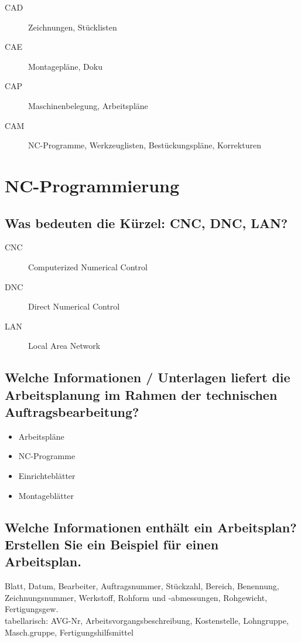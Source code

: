 \begin{description}
\item[CAD] Zeichnungen, Stücklisten
\item[CAE] Montagepläne, Doku
\item[CAP] Maschinenbelegung, Arbeitspläne
\item[CAM] NC-Programme, Werkzeuglisten, Bestückungspläne, Korrekturen
\end{description}

\newpage

\section{NC-Programmierung}

\subsection*{Was bedeuten die Kürzel: CNC, DNC, LAN?}

\begin{description}
\item[CNC] Computerized Numerical Control
\item[DNC] Direct Numerical Control
\item[LAN] Local Area Network
\end{description}

\subsection*{Welche Informationen / Unterlagen liefert die Arbeitsplanung im Rahmen der technischen Auftragsbearbeitung?}

\begin{itemize}
\item Arbeitspläne
\item NC-Programme
\item Einrichteblätter
\item Montageblätter
\end{itemize}

\subsection*{Welche Informationen enthält ein Arbeitsplan? Erstellen Sie ein Beispiel für einen Arbeitsplan.}

Blatt, Datum, Bearbeiter, Auftragsnummer, Stückzahl, Bereich, Benennung, Zeichnungsnummer, Werkstoff, Rohform und -abmessungen, Rohgewicht, Fertigungsgew. \\
tabellarisch: AVG-Nr, Arbeitsvorgangsbeschreibung, Kostenstelle, Lohngruppe, Masch.gruppe, 
Fertigungshilfsmittel

